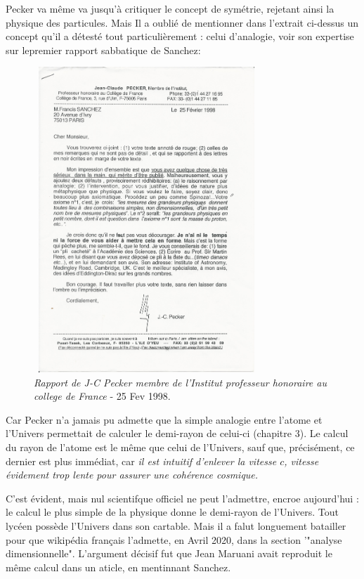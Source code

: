 \documentclass[a4paper,12pt]{article}
\begin{document}
Pecker va même va jusqu'à critiquer le concept de symétrie, rejetant ainsi la physique des particules. Mais Il a oublié de mentionner dans l'extrait ci-dessus un concept qu'il a détesté tout particulièrement : celui d'analogie, voir son expertise sur lepremier rapport sabbatique de Sanchez:


\begin{figure}
\centering
\includegraphics[width=8.5cm,height=11.5cm]{./figures/Pecker98.jpg}
\caption [Rapport de JC Pecker évaluant le travail en cosmologie de Francis M. Sanchez]{\textit{Rapport de J-C Pecker membre de l'Institut professeur honoraire au college de France} - 25 Fev 1998.} 
\label{fig:17:figure17}
\end{figure}


Car Pecker n'a jamais pu admette que la simple analogie entre l'atome et l'Univers permettait de calculer le demi-rayon de celui-ci (chapitre 3). Le calcul du rayon de l'atome est le même que celui de l'Univers, sauf que, précisément, ce dernier est plus immédiat, car \textit{il est intuitif d'enlever la vitesse $c$, vitesse évidement trop lente pour assurer une cohérence cosmique.}


C'est évident, mais nul scientifque officiel ne peut l'admettre, encroe aujourd'hui : le calcul le plus simple de la physique donne le demi-rayon de l'Univers. Tout lycéen possède l'Univers dans son cartable. Mais il a falut longuement batailler pour que wikipédia français l'admette, en Avril 2020, dans la section '"analyse dimensionnelle". L'argument décisif fut que Jean Maruani avait reproduit le m\^eme calcul dans un aticle, en mentinnant Sanchez. 
\end{document}
